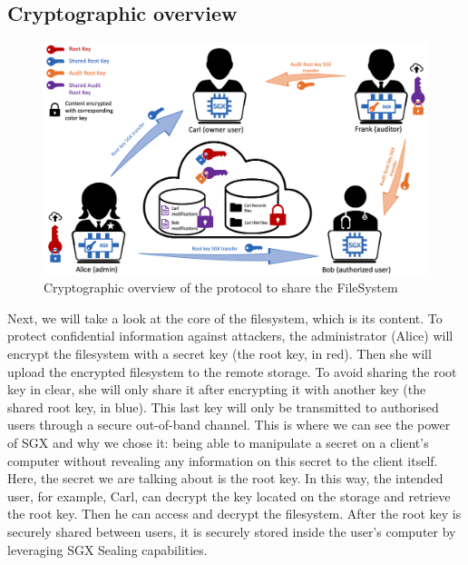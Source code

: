 \documentclass[../main.tex]{subfiles}
\begin{document}
\subsection{Cryptographic overview}
\label{section:lauxus:approach_crypto}
\begin{figure}[h]
    \centering
    \includegraphics[width=\textwidth]{images/lauxus/approach_crypto}
    
    \caption{Cryptographic overview of the protocol to share the FileSystem}
    \label{figure:lauxus:approach_crypto}
\end{figure}
\par Next, we will take a look at the core of the filesystem, which is its content. To protect confidential information against attackers, the administrator (Alice) will encrypt the filesystem with a secret key (the root key, in red). Then she will upload the encrypted filesystem to the remote storage. To avoid sharing the root key in clear, she will only share it after encrypting it with another key (the shared root key, in blue). This last key will only be transmitted to authorised users through a secure out-of-band channel. This is where we can see the power of SGX and why we chose it: being able to manipulate a secret on a client's computer without revealing any information on this secret to the client itself. Here, the secret we are talking about is the root key. In this way, the intended user, for example, Carl, can decrypt the key located on the storage and retrieve the root key. Then he can access and decrypt the filesystem. After the root key is securely shared between users, it is securely stored inside the user's computer by leveraging SGX Sealing capabilities.
\end{document}

